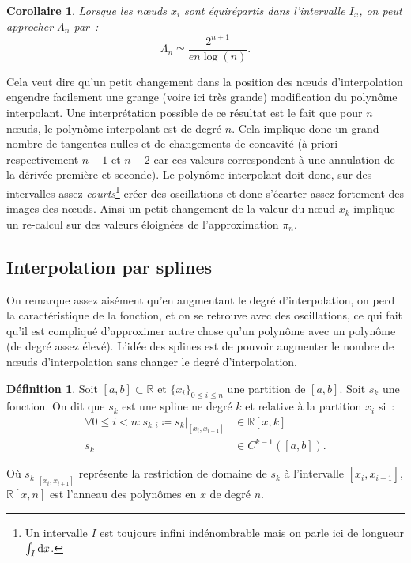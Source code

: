 \documentclass{article}
\newtheorem{cor}[thm]{Corollaire}
\theoremstyle{definition}
\newtheorem{déf}[thm]{Définition}
\theoremstyle{remark}
\newcommand{\R}{\mathbb R}
\begin{document}
		\begin{cor} Lorsque les nœuds $x_i$ sont équirépartis dans l'intervalle $I_x$, on peut approcher $\Lambda_n$ par~:
		\[\Lambda_n \simeq \frac {2^{n+1}}{en\log(n)}.\]
		\end{cor}

		Cela veut dire qu'un petit changement dans la position des nœuds d'interpolation engendre facilement une grange (voire ici très grande) modification
		du polynôme interpolant. Une interprétation possible de ce résultat est le fait que pour $n$ nœuds, le polynôme interpolant est de degré $n$. Cela
		implique donc un grand nombre de tangentes nulles et de changements de concavité (à priori respectivement $n-1$ et $n-2$ car ces valeurs correspondent
		à une annulation de la dérivée première et seconde). Le polynôme interpolant doit donc, sur des intervalles assez \emph{courts}\footnote{Un intervalle
		$I$ est toujours infini indénombrable mais on parle ici de longueur $\int_I\dif x$.} créer des oscillations et donc s'écarter assez fortement des images
		des nœuds. Ainsi un petit changement de la valeur du nœud $x_k$ implique un re-calcul sur des valeurs éloignées de l'approximation $\pi_n$.

	\subsection{Interpolation par splines}
		On remarque assez aisément qu'en augmentant le degré d'interpolation, on perd la caractéristique de la fonction, et on se retrouve avec des
		oscillations, ce qui fait qu'il est compliqué d'approximer autre chose qu'un polynôme avec un polynôme (de degré assez élevé). L'idée des splines est
		de pouvoir augmenter le nombre de nœuds d'interpolation sans changer le degré d'interpolation.

		\begin{déf} Soit $[a, b] \subset \R$ et $\{x_i\}_{0 \leq i \leq n}$ une partition de $[a, b]$. Soit $s_k$ une fonction. On dit que $s_k$ est une spline
		ne degré $k$ et relative à la partition $x_i$ si~:
		\begin{align*}
			\forall 0 \leq i < n : s_{k, i} \coloneqq s_k\big\rvert_{[x_i, x_{i+1}]} &\in \R[x, k] \\
			s_k &\in C^{k-1}\left([a, b]\right).
		\end{align*}

		Où $s_k\big\rvert_{[x_i, x_{i+1}]}$ représente la restriction de domaine de $s_k$ à l'intervalle $[x_i, x_{i+1}]$, $\R[x, n]$ est l'anneau des polynômes
		en $x$ de degré $n$.
		\end{déf}
\end{document}
